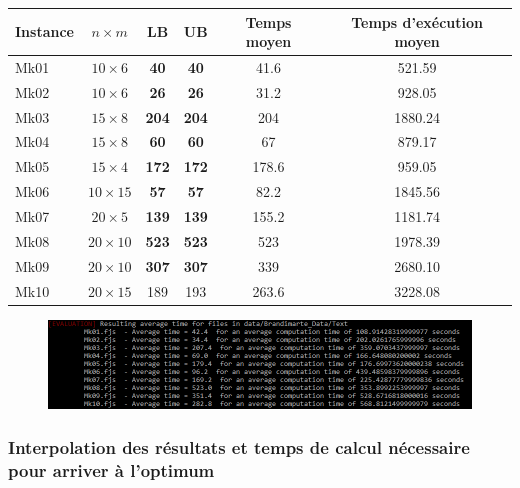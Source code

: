 \begin{table}[!h]
    \renewcommand{\arraystretch}{1.5}
    \centering
    \begin{tabular}{p{} c c c c c}
        Instance & $n \times m$ & LB & UB & Temps moyen & Temps d'exécution moyen \\
         \hline
        Mk01 & $10 \times 6$ & \textbf{40} & \textbf{40} & 41.6 & 521.59 \\
         \hline
        Mk02 & $10 \times 6$ & \textbf{26} & \textbf{26} & 31.2 & 928.05 \\
         \hline
        Mk03 & $15 \times 8$ & \textbf{204} & \textbf{204} & 204 & 1880.24 \\
         \hline
        Mk04 & $15 \times 8$ & \textbf{60} & \textbf{60} & 67 & 879.17 \\
         \hline
        Mk05 & $15 \times 4$ & \textbf{172} & \textbf{172} & 178.6 & 959.05 \\
         \hline
        Mk06 & $10 \times 15$ & \textbf{57} & \textbf{57} & 82.2 & 1845.56 \\
         \hline
        Mk07 & $20 \times 5$ & \textbf{139} & \textbf{139} & 155.2 & 1181.74 \\
         \hline
        Mk08 & $20 \times 10$ & \textbf{523} & \textbf{523} & 523 & 1978.39 \\
         \hline
        Mk09 & $20 \times 10$ & \textbf{307} & \textbf{307} & 339 & 2680.10 \\
         \hline
        Mk10 & $20 \times 15$ & 189 & 193 & 263.6 & 3228.08 \\
         \hline 
    \end{tabular}
\end{table}

\begin{figure}[!h]
    \centering
    \includegraphics[width=\linewidth]{report/Pictures/brandimarte_200_500.png}
\end{figure}

\subsubsection{Interpolation des résultats et temps de calcul nécessaire pour arriver à l'optimum}

